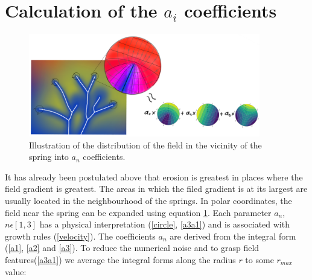 \documentclass[]{pracamgr}
\begin{document}
    \section{Calculation of the $a_i$ coefficients}
      
      \begin{figure}[H]
        \centering
        \includegraphics[width=0.9\textwidth]{figs/series_params_integration.png}        
        \caption{Illustration of the distribution of the field in the vicinity of the spring into $a_n$ coefficients.}
        \label{series_params_integration}
      \end{figure}

      It has already been postulated above that erosion is greatest in places where the field gradient is greatest. The areas in which the filed gradient is at its largest are usually located in the neighbourhood of the springs. In polar coordinates, the field near the spring can be expanded using equation \ref{series_params_integration}. Each parameter $a_n$, $n \epsilon [1, 3]$ has a physical interpretation (\ref{circle}, \ref{a3a1}) and is associated with growth rules (\ref{velocity}). The coefficients $a_n$ are derived from the integral form (\ref{a1}, \ref{a2} and \ref{a3}). To reduce the numerical noise and to grasp field features(\ref{a3a1}) we average the integral forms along the radius $r$ to some $r_{max}$ value:
      
\end{document}
